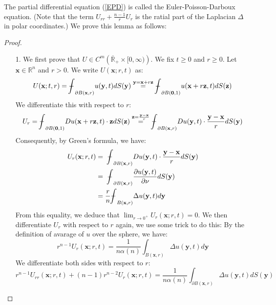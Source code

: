 \documentclass[10pt]{article}
\def\rr{{\mathbb R}}
\def\vc{{\mathbf x}}
\newcommand\tbbint{{-\mkern -16mu\int}}
\newcommand\dbbint{{-\mkern -19mu\int}}
\newcommand\bbint{
{\mathchoice{\dbbint}{\tbbint}{\tbbint}{\tbbint}}
}
\begin{document}
The partial differential equation (\ref{EPD}) is called the Euler-Poisson-Darboux equation. (Note that the term $U_{rr}+\frac{n-1}{r} U_r$ is the ratial part of the Laplacian $\Delta$ in polar coordinates.) We prove this lemma as follows:
\begin{proof}
    \begin{itemize}
        \item [1.] We first prove that $U \in C^{m}\left(\overline{\mathbb{R}}_{+} \times[0, \infty)\right)$. We fix $t \geq 0$ and $r \geq 0$. Let $\vc \in \rr^n$ and $r>0$. We write $U(\vc; r ,t)$ as:
        \begin{equation*}
            U(\vc;t,r) = \bbint_{\partial B(\vc,r)} u(\mathbf{y},t) d S(\mathbf{y}) \overset{\mathbf{y} = \mathbf{x}+r\mathbf{z}}{=} \bbint_{\partial B(\mathbf{0},1)} u(\vc+r \mathbf{z},t)  d S(\mathbf{z})
        \end{equation*}
        We differentiate this with respect to $r$:
        \begin{equation*}
            U_r = \bbint_{\partial B(\mathbf{0},1)} D u(\vc+r \mathbf{z},t) \cdot \mathbf{z} d S(\mathbf{z}) \overset{\mathbf{z} = \frac{\mathbf{y}-\vc}{r}}{=} \bbint_{\partial B(\vc,r)} D u(\mathbf{y},t) \cdot \frac{\mathbf{y}-\vc}{r} d S(\mathbf{y})
        \end{equation*}
        Consequently, by Green's formula, we have:
        \begin{align*}
            U_r(\vc; r, t) &= \ \bbint_{\partial B(\vc,r)} D u(\mathbf{y},t) \cdot \frac{\mathbf{y}-\vc}{r} d S(\mathbf{y}) \\
                           &= \ \bbint_{\partial B(\vc,r)} \frac{\partial u(\mathbf{y},t)}{\partial \nu} d S(\mathbf{y})\\
                         &= \frac{r}{n} \bbint_{ B(\vc,r)} \Delta u(\mathbf{y},t) d \mathbf{y}
        \end{align*}
        From this equality, we deduce that $\lim_{r \to 0^+} U_r(\vc;r,t) = 0$. 
        We then differentiate $U_r$ with respect to $r$ again, we use some trick to do this:
        By the definition of avarage of $u$ over the sphere, we have:
        \begin{equation*}
            r^{n-1} U_r(\vc;r,t) = \frac{1}{n\alpha(n)} \int_{B(\vc,r)} \Delta u(\mathbf{y},t) d \mathbf{y}
        \end{equation*}
        We differentiate both sides with respect to $r$:
        \begin{equation*}
            r^{n-1} U_{rr}(\vc;r,t) + (n-1)r^{n-2} U_r(\vc;r,t) = \frac{1}{n\alpha(n)} \int_{\partial B(\vc,r)} \Delta u(\mathbf{y},t) d S(\mathbf{y})

\end{equation*}
\end{itemize}
\end{proof}
\end{document}
